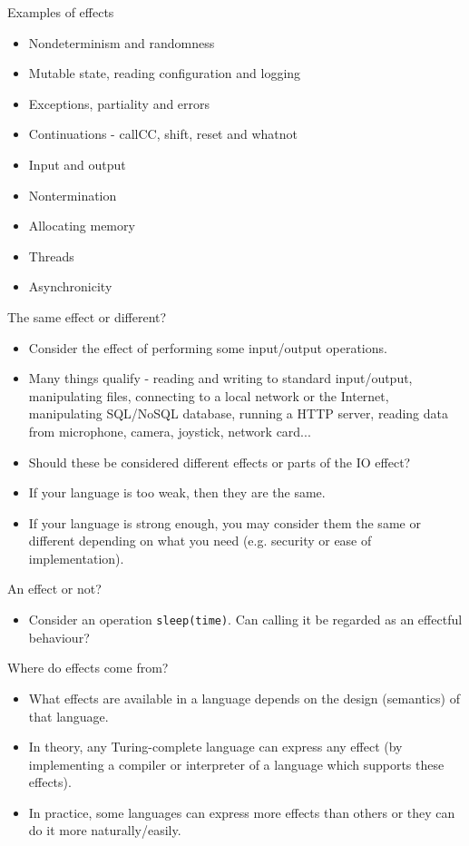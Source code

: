 \documentclass{beamer}
\begin{document}
\begin{frame}{Examples of effects}
\begin{itemize}
	\item Nondeterminism and randomness
	\item Mutable state, reading configuration and logging
	\item Exceptions, partiality and errors
	\item Continuations - callCC, shift, reset and whatnot
	\item Input and output
	\item Nontermination
	\item Allocating memory
	\item Threads
	\item Asynchronicity
\end{itemize}
\end{frame}

\begin{frame}{The same effect or different?}
\begin{itemize}
	\item Consider the effect of performing some input/output operations.
	\item Many things qualify - reading and writing to standard input/output, manipulating files, connecting to a local network or the Internet, manipulating SQL/NoSQL database, running a HTTP server, reading data from microphone, camera, joystick, network card...
	\item Should these be considered different effects or parts of the IO effect?
	\item If your language is too weak, then they are the same.
	\item If your language is strong enough, you may consider them the same or different depending on what you need (e.g. security or ease of implementation).
\end{itemize}
\end{frame}

\begin{frame}{An effect or not?}
\begin{itemize}
	\item Consider an operation \texttt{sleep(time)}. Can calling it be regarded as an effectful behaviour?
\end{itemize}
\end{frame}


\begin{frame}{Where do effects come from?}
\begin{itemize}
	\item What effects are available in a language depends on the design (semantics) of that language.
	\item In theory, any Turing-complete language can express any effect (by implementing a compiler or interpreter of a language which supports these effects).
	\item In practice, some languages can express more effects than others or they can do it more naturally/easily.
\end{itemize}
\end{frame}
\end{document}
